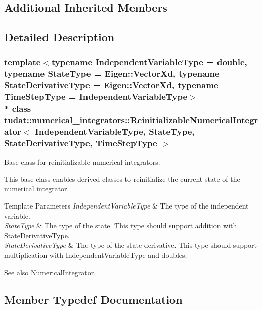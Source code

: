 \subsection*{Additional Inherited Members}


\subsection{Detailed Description}
\subsubsection*{template$<$typename Independent\+Variable\+Type = double, typename State\+Type = Eigen\+::\+Vector\+Xd, typename State\+Derivative\+Type = Eigen\+::\+Vector\+Xd, typename Time\+Step\+Type = Independent\+Variable\+Type$>$\\*
class tudat\+::numerical\+\_\+integrators\+::\+Reinitializable\+Numerical\+Integrator$<$ Independent\+Variable\+Type, State\+Type, State\+Derivative\+Type, Time\+Step\+Type $>$}

Base class for reinitializable numerical integrators. 

This base class enables derived classes to reinitialize the current state of the numerical integrator. 
\begin{DoxyTemplParams}{Template Parameters}
{\em Independent\+Variable\+Type} & The type of the independent variable. \\
\hline
{\em State\+Type} & The type of the state. This type should support addition with State\+Derivative\+Type. \\
\hline
{\em State\+Derivative\+Type} & The type of the state derivative. This type should support multiplication with Independent\+Variable\+Type and doubles. \\
\hline
\end{DoxyTemplParams}
\begin{DoxySeeAlso}{See also}
\hyperlink{classtudat_1_1numerical__integrators_1_1NumericalIntegrator}{Numerical\+Integrator}. 
\end{DoxySeeAlso}


\subsection{Member Typedef Documentation}
